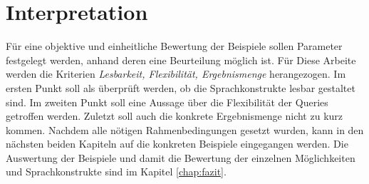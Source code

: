 \section{Interpretation}
Für eine objektive und einheitliche Bewertung der Beispiele sollen Parameter festgelegt
werden, anhand deren eine Beurteilung möglich ist. Für Diese Arbeite werden die Kriterien
\textit{Lesbarkeit, Flexibilität, Ergebnismenge} herangezogen. Im ersten Punkt soll
als überprüft werden, ob die Sprachkonstrukte lesbar gestaltet sind. Im zweiten Punkt
soll eine Aussage über die Flexibilität der Queries getroffen werden. Zuletzt
soll auch die konkrete Ergebnismenge nicht zu kurz kommen. Nachdem alle nötigen Rahmenbedingungen
gesetzt wurden, kann in den nächsten beiden Kapiteln auf die konkreten Beispiele
eingegangen werden. Die Auswertung der Beispiele und damit die Bewertung der einzelnen
Möglichkeiten und Sprachkonstrukte sind im Kapitel \ref{chap:fazit}.